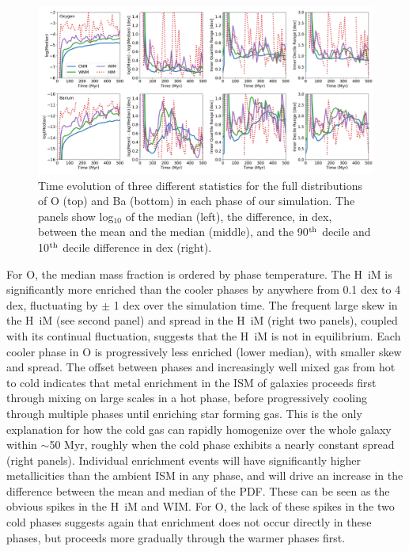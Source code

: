 \documentclass[twocolumn]{aastex61}
\begin{document}
\begin{figure}
\centering
\includegraphics[width=0.95\linewidth]{O_Ba_distribution_evolution.png}
\caption{Time evolution of three different statistics for the full distributions of O (top) and Ba (bottom) in each phase of our simulation. The panels show log$_{10}$ of the median (left), the difference, in dex, between the mean and the median (middle), and the 90$^{\rm th}$ decile and 10$^{\rm th}$ decile difference in dex (right).}
\label{fig:phase-statistics}
\end{figure}

For O, the median mass fraction is ordered by phase temperature. The H~{\sc i}M is significantly more enriched than the cooler phases by anywhere from 0.1 dex to 4 dex, fluctuating by $\pm$ 1 dex over the simulation time. The frequent large skew in the H~{\sc i}M (see second panel) and spread in the H~{\sc i}M (right two panels), coupled with its continual fluctuation, suggests that the H~{\sc i}M is not in equilibrium. 
Each cooler phase in O is progressively less enriched (lower median), with smaller skew and spread. The offset between phases and increasingly well mixed gas from hot to cold indicates that metal enrichment in the ISM of galaxies proceeds first through mixing on large scales in a hot phase, before progressively cooling through multiple phases until enriching star forming gas. This is the only explanation for how the cold gas can rapidly homogenize over the whole galaxy within $\sim$50 Myr, roughly when the cold phase exhibits a nearly constant spread (right panels). Individual enrichment events will have significantly higher metallicities than the ambient ISM in any phase, and will drive an increase in the difference between the mean and median of the PDF. These can be seen as the obvious spikes in the H~{\sc i}M and WIM. For O, the lack of these spikes in the two cold phases suggests again that enrichment does not occur directly in these phases, but proceeds more gradually through the warmer phases first.
\end{document}
